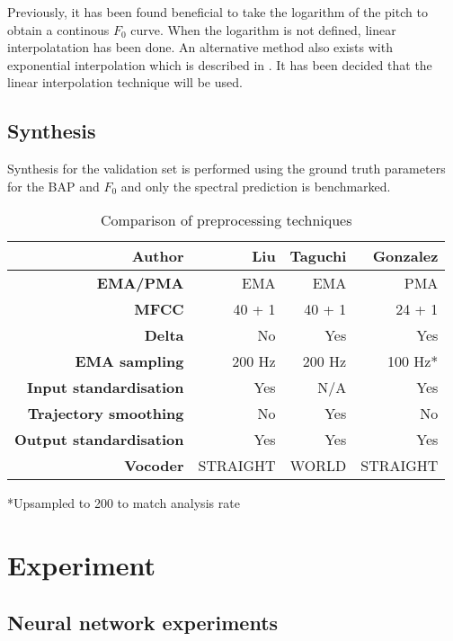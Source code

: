 \documentclass[a4paper]{article}
\begin{document}
Previously, it has been found beneficial to take the logarithm of the
pitch to obtain a continous \( F_0 \) curve.
When the logarithm is not defined, linear  interpolatation has been done. \cite{Gonzalez2017}
An alternative method also exists with exponential interpolation
which is described in \cite{Chen1997}. It has been decided that the
linear interpolation technique will be used. 

\subsection{Synthesis}

Synthesis for the validation set is performed using the ground truth
parameters for the BAP and $ F_0 $ and only the spectral prediction is
benchmarked.

\begin{table}[th]
  \caption{Comparison of preprocessing techniques}
  \label{tab:example}
  \centering
  \footnotesize
  \begin{tabular}{ r r r r }
    \toprule
    \textbf{Author} & \textbf{Liu} & \textbf{Taguchi} & \textbf{Gonzalez} \\
    \midrule
    \textbf{EMA/PMA} & EMA & EMA & PMA \\
    \textbf{MFCC} & 40 + 1 & 40 + 1 & 24 + 1 \\
    \textbf{Delta} & No & Yes & Yes \\
    \textbf{EMA sampling} & 200 Hz & 200 Hz & 100 Hz* \\
    \textbf{Input standardisation} & Yes & N/A  & Yes \\
    \textbf{Trajectory smoothing} & No & Yes  & No \\
    \textbf{Output standardisation} & Yes & Yes & Yes \\
    \textbf{Vocoder} & STRAIGHT & WORLD  & STRAIGHT \\
    \bottomrule
    
  \end{tabular}
  *Upsampled to 200 to match analysis rate
\end{table}

\section{Experiment}

\subsection{Neural network experiments} \label{nnexperiment}
\end{document}
